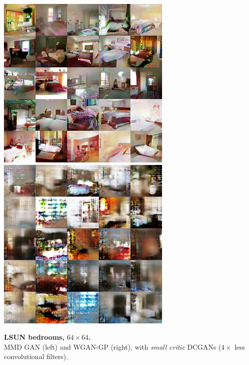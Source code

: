 \documentclass[xcolor={table}]{beamer}
\begin{document}
\begin{frame}{}
\begin{columns}[T, totalwidth=\textwidth]
\begin{column}{.32\textwidth}
    \begin{minipage}{.57\linewidth}
      \includegraphics[width=.49\linewidth]{samples/lsun_rq_16.png}
      \hfill
      \includegraphics[width=.49\linewidth]{samples/lsun_wgan_16.png}
    \end{minipage}
    \begin{minipage}{.42\linewidth}\raggedright
       \textbf{LSUN bedrooms, $64 \times 64$.}\\
       MMD GAN (left) and WGAN-GP (right),
       with \emph{small critic} DCGANs ($4\times$ less convolutional filters).
    \end{minipage}
    ~\\
    ~\\


\end{column}
\end{columns}
\end{frame}
\end{document}
